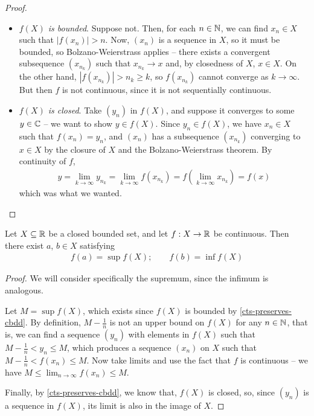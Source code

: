 \documentclass{../template/note}
\begin{document}
    \begin{proof}
        \begin{itemize}
            \item \emph{\(f(X)\) is bounded}. Suppose not. Then, for each \(n \in \mathbb N\), we can find \(x_n \in X\) such that \(|f(x_n)| > n\). Now, \((x_n)\) is a sequence in \(X\), so it must be bounded, so Bolzano-Weierstrass applies -- there exists a convergent subsequence \((x_{n_k})\) such that \(x_{n_k} \to x\) and, by closedness of \(X\), \(x \in X\). On the other hand, \(|f(x_{n_k})| > n_k \geq k\), so \(f(x_{n_k})\) cannot converge as \(k \to \infty\). But then \(f\) is not continuous, since it is not sequentially continuous.
            \item \emph{\(f(X)\) is closed}. Take \((y_n)\) in \(f(X)\), and suppose it converges to some \(y \in \mathbb C\) -- we want to show \(y \in f(X)\). Since \(y_n \in f(X)\), we have \(x_n \in X\) such that \(f(x_n) = y_n\), and \((x_n)\) has a subsequence \((x_{n_k})\) converging to \(x \in X\) by the closure of \(X\) and the Bolzano-Weierstrass theorem. By continuity of \(f\),
            \begin{align*}
                y = \lim_{k \to \infty} y_{n_k} = \lim_{k \to \infty} f(x_{n_k}) = f\left(\lim_{k \to \infty} x_{n_k}\right) = f(x)
            \end{align*}
            which was what we wanted.            
        \end{itemize}
        
        
    \end{proof}
    

    \begin{theorem}
        \label{evt}
        Let \(X \subseteq \mathbb R\) be a closed bounded set, and let \(f: X \to \mathbb R\) be continuous. Then there exist \(a\), \(b \in X\) satisfying
        \begin{align*}
            f(a) = \sup f(X); \qquad f(b) = \inf f(X)
        \end{align*}
    \end{theorem}

    
    \begin{proof}
        We will consider specifically the supremum, since the infimum is analogous.

        Let \(M = \sup f(X)\), which exists since \(f(X)\) is bounded by \cref{cts-preserves-cbdd}. By definition, \(M - \frac 1 n\) is not an upper bound on \(f(X)\) for any \(n \in \mathbb N\), that is, we can find a sequence \((y_n)\) with elements in \(f(X)\) such that \(M - \frac 1 n < y_n \leq M\), which produces a sequence \((x_n)\) on \(X\) such that \(M - \frac 1 n < f(x_n) \leq M\). Now take limits and use the fact that \(f\) is continuous -- we have \(M \leq \lim_{n \to \infty} f(x_n) \leq M\).

        Finally, by \cref{cts-preserves-cbdd}, we know that, \(f(X)\) is closed, so, since \((y_n)\) is a sequence in \(f(X)\), its limit is also in the image of \(X\).        
    \end{proof}
\end{document}
